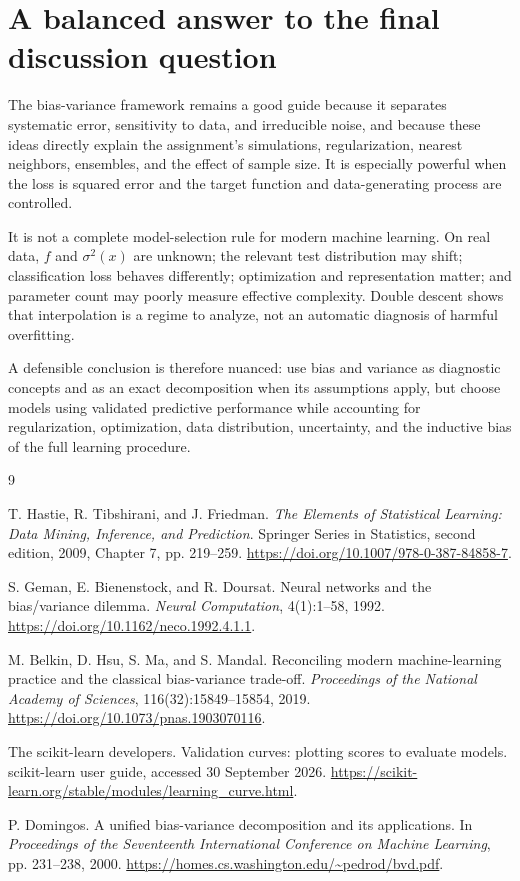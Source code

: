 \documentclass[11pt,a4paper]{article}
\begin{document}
\section{A balanced answer to the final discussion question}

The bias-variance framework remains a good guide because it separates systematic error, sensitivity to data, and irreducible noise, and because these ideas directly explain the assignment's simulations, regularization, nearest neighbors, ensembles, and the effect of sample size. It is especially powerful when the loss is squared error and the target function and data-generating process are controlled.

It is not a complete model-selection rule for modern machine learning. On real data, $f$ and $\sigma^2(x)$ are unknown; the relevant test distribution may shift; classification loss behaves differently; optimization and representation matter; and parameter count may poorly measure effective complexity. Double descent shows that interpolation is a regime to analyze, not an automatic diagnosis of harmful overfitting.

A defensible conclusion is therefore nuanced: use bias and variance as diagnostic concepts and as an exact decomposition when its assumptions apply, but choose models using validated predictive performance while accounting for regularization, optimization, data distribution, uncertainty, and the inductive bias of the full learning procedure.

\begin{thebibliography}{9}

T. Hastie, R. Tibshirani, and J. Friedman.
\newblock \emph{The Elements of Statistical Learning: Data Mining, Inference, and Prediction}.
\newblock Springer Series in Statistics, second edition, 2009, Chapter 7, pp. 219--259.
\newblock \url{https://doi.org/10.1007/978-0-387-84858-7}.

S. Geman, E. Bienenstock, and R. Doursat.
\newblock Neural networks and the bias/variance dilemma.
\newblock \emph{Neural Computation}, 4(1):1--58, 1992.
\newblock \url{https://doi.org/10.1162/neco.1992.4.1.1}.

M. Belkin, D. Hsu, S. Ma, and S. Mandal.
\newblock Reconciling modern machine-learning practice and the classical bias-variance trade-off.
\newblock \emph{Proceedings of the National Academy of Sciences}, 116(32):15849--15854, 2019.
\newblock \url{https://doi.org/10.1073/pnas.1903070116}.

The scikit-learn developers.
\newblock Validation curves: plotting scores to evaluate models.
\newblock scikit-learn user guide, accessed 30 September 2026.
\newblock \url{https://scikit-learn.org/stable/modules/learning_curve.html}.

P. Domingos.
\newblock A unified bias-variance decomposition and its applications.
\newblock In \emph{Proceedings of the Seventeenth International Conference on Machine Learning}, pp. 231--238, 2000.
\newblock \url{https://homes.cs.washington.edu/~pedrod/bvd.pdf}.

\end{thebibliography}
\end{document}
